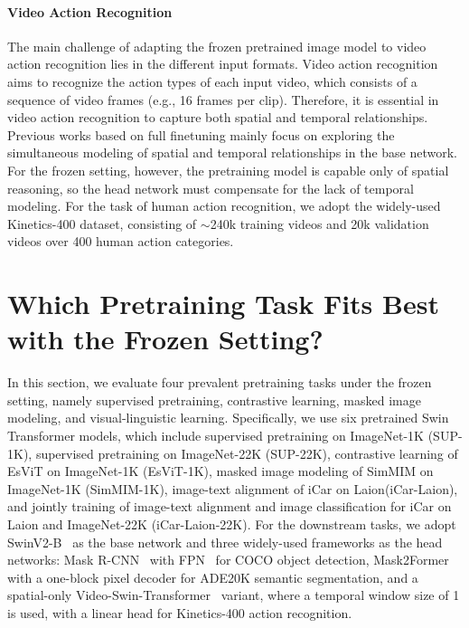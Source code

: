 \documentclass{article}
\begin{document}
\paragraph{Video Action Recognition} The main challenge of adapting the frozen pretrained image model to video action recognition lies in the different input formats. Video action recognition aims to recognize the action types of each input video, which consists of a sequence of video frames (e.g., 16 frames per clip). Therefore, it is essential in video action recognition to capture both spatial and temporal relationships. Previous works based on full finetuning mainly focus on exploring the simultaneous modeling of spatial and temporal relationships in the base network. For the frozen setting, however, the pretraining model is capable only of spatial reasoning, so the head network must compensate for the lack of temporal modeling. For the task of human action recognition, we adopt the widely-used Kinetics-400 \cite{kay2017kinetics} dataset, consisting of $\sim$240k training videos and 20k validation videos over 400 human action categories. 

\section{Which Pretraining Task Fits Best with the Frozen Setting?}
\label{sec:which_task_fit}

In this section, we evaluate four prevalent pretraining tasks under the frozen setting, namely supervised pretraining, contrastive learning, masked image modeling, and visual-linguistic learning. Specifically, we use six pretrained Swin Transformer models, which include supervised pretraining on ImageNet-1K (SUP-1K), supervised pretraining on ImageNet-22K (SUP-22K), contrastive learning of EsViT on ImageNet-1K (EsViT-1K), masked image modeling of SimMIM on ImageNet-1K (SimMIM-1K), image-text alignment of iCar on Laion\cite{schuhmann2021laion}(iCar-Laion), and jointly training of image-text alignment and image classification for iCar on Laion and ImageNet-22K (iCar-Laion-22K). For the downstream tasks, we adopt SwinV2-B~\cite{swinv2} as the base network and three widely-used frameworks as the head networks: Mask R-CNN~\cite{Mask-rcnn} with FPN~\cite{FPN} for COCO object detection, Mask2Former~\cite{mask2former} with a one-block pixel decoder for ADE20K semantic segmentation, and a 
spatial-only Video-Swin-Transformer~\cite{liu2021video} variant, where a temporal window size of 1 is used, with a linear head for Kinetics-400 action recognition.
\end{document}
